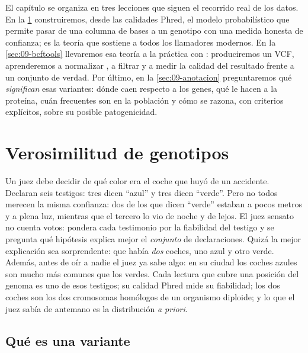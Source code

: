 El capítulo se organiza en tres lecciones que siguen el recorrido real de los datos. En la \cref{sec:09-verosimilitud} construiremos, desde las calidades Phred, el modelo probabilístico que permite pasar de una columna de bases a un genotipo con una medida honesta de confianza; es la teoría que sostiene a todos los llamadores modernos. En la \cref{sec:09-bcftools} llevaremos esa teoría a la práctica con : produciremos un VCF, aprenderemos a normalizar , a filtrar y a medir la calidad del resultado frente a un conjunto de verdad. Por último, en la \cref{sec:09-anotacion} preguntaremos qué \emph{significan} esas variantes: dónde caen respecto a los genes, qué le hacen a la proteína, cuán frecuentes son en la población y cómo se razona, con criterios explícitos, sobre su posible patogenicidad.

\section{Verosimilitud de genotipos}\label{sec:09-verosimilitud}

\begin{intuicion}
Un juez debe decidir de qué color era el coche que huyó de un accidente. Declaran seis testigos: tres dicen ``azul'' y tres dicen ``verde''. Pero no todos merecen la misma confianza: dos de los que dicen ``verde'' estaban a pocos metros y a plena luz, mientras que el tercero lo vio de noche y de lejos. El juez sensato no cuenta votos: pondera cada testimonio por la fiabilidad del testigo y se pregunta qué hipótesis explica mejor el \emph{conjunto} de declaraciones. Quizá la mejor explicación sea sorprendente: que había \emph{dos} coches, uno azul y otro verde. Además, antes de oír a nadie el juez ya sabe algo: en su ciudad los coches azules son mucho más comunes que los verdes. Cada lectura que cubre una posición del genoma es uno de esos testigos; su calidad Phred mide su fiabilidad; los dos coches son los dos cromosomas homólogos de un organismo diploide; y lo que el juez sabía de antemano es la distribución \emph{a priori}.
\end{intuicion}

\subsection{Qué es una variante}

